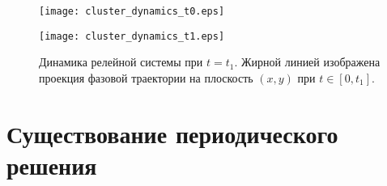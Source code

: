 \begin{figure}[!htb]
	\begin{minipage}{0.48\textwidth}
		\centering
		\texttt{[image: cluster\_dynamics\_t0.eps]}
		\caption{Динамика релейной системы при $t = t_0$. Жирной линией изображена проекция фазовой траектории на плоскость $(x, y)$ при $t \in [0, t_0]$. %
		}
		\label{fig:dynamics_t0}
	\end{minipage}\hfill
	\begin{minipage}{0.48\textwidth}
		\centering
		\texttt{[image: cluster\_dynamics\_t1.eps]}
		\caption{Динамика релейной системы при $t = t_1$. Жирной линией изображена проекция фазовой траектории на плоскость $(x, y)$ при $t \in [0, t_1]$.}
		\label{fig:dynamics_t1}
	\end{minipage}
\end{figure}


\section{Существование периодического решения}\label{sec:ch3/sect4}

